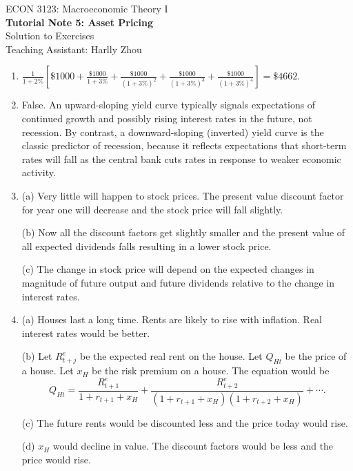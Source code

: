 \documentclass[12pt]{article}
\begin{document}
\begin{center}
    ECON 3123: Macroeconomic Theory I\\
    {\large \textbf{Tutorial Note 5: Asset Pricing}}\\
    Solution to Exercises\\
    Teaching Assistant: Harlly Zhou
\end{center}

\begin{enumerate}[label=\arabic*.]
    \item $\frac{1}{1+2\%}\left[\$1000 + \frac{\$1000}{1+3\%} + \frac{\$1000}{(1+3\%)^2} + \frac{\$1000}{(1+3\%)^3} + \frac{\$1000}{(1+3\%)^4}\right] = \$4662$.

    \item False. An upward-sloping yield curve typically signals expectations of continued growth and possibly rising interest rates in the future, not recession. By contrast, a downward-sloping (inverted) yield curve is the classic predictor of recession, because it reflects expectations that short-term rates will fall as the central bank cuts rates in response to weaker economic activity.

    \item (a) Very little will happen to stock prices. The present value discount factor for year one will decrease and the stock price will fall slightly.
    
    (b) Now all the discount factors get slightly smaller and the present value of all expected dividends falls resulting in a lower stock price.
    
    (c) The change in stock price will depend on the expected changes in magnitude of future output and future dividends relative to the change in interest rates.

    \item (a) Houses last a long time. Rents are likely to rise with inflation. Real interest rates would be better.
    
    (b) Let $R^e_{t+j}$ be the expected real rent on the house. Let $Q_{Ht}$ be the price of a house. Let $x_H$ be the risk premium on a house. The equation would be
    \[Q_{Ht} = \frac{R^e_{t+1}}{1 + r_{t+1} + x_H} + \frac{R^e_{t+2}}{(1 + r_{t+1} + x_H)(1 + r_{t+2} + x_H)} + \cdots.\]

    (c) The future rents would be discounted less and the price today would rise.

    (d) $x_H$ would decline in value. The discount factors would be less and the price would rise.
    
\end{enumerate}
\end{document}
